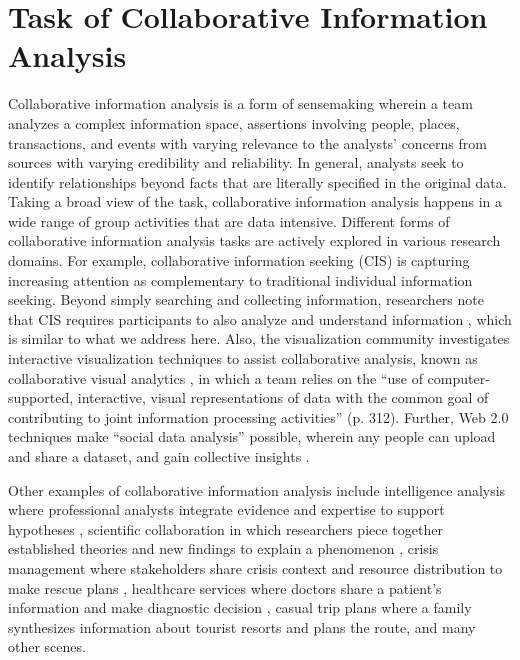 \section{Task of Collaborative Information Analysis}

Collaborative information analysis is a form of sensemaking wherein a team
analyzes a complex information space, assertions involving people, places,
transactions, and events with varying relevance to the analysts’ concerns from
sources with varying credibility and reliability. In general,
analysts seek to identify relationships beyond facts that are literally specified in the original data. Taking a broad view of the task, collaborative information analysis happens in a wide range of group activities that are data intensive. Different forms of collaborative information analysis tasks
are actively explored in various research domains. For example, collaborative
information seeking (CIS) \citep{Shah2014i} is capturing increasing attention as
complementary to traditional individual information seeking. Beyond simply
searching and collecting information, researchers note that CIS requires
participants to also analyze and understand information \citep{Paul2010}, which is similar to what we address here. Also, the visualization
community investigates interactive visualization techniques to assist collaborative
analysis, known as collaborative visual analytics \citep{Isenberg2011}, in which a team relies on the
``use of computer-supported, interactive, visual representations of data with
the common goal of contributing to joint information processing activities''
(p. 312). Further, Web 2.0 techniques make ``social data
analysis'' possible, wherein any people can upload and share a dataset, and gain
collective insights \citep{Morton2014}.

Other examples of collaborative information analysis include
intelligence analysis where professional analysts integrate evidence and
expertise to support hypotheses \citep{Heuer1999, prue2014overcoming}, scientific collaboration in
which researchers piece together established theories and new findings to
explain a phenomenon \citep{Farooq2009}, crisis management
where stakeholders share crisis context and resource distribution to make rescue
plans \citep{Tomaszewski2012b, Convertino2011}, healthcare services where doctors share
a patient’s information and make diagnostic decision \citep{Reddy2008c}, casual
trip plans where a family synthesizes information about tourist resorts and plans
the route, and many other scenes. 

